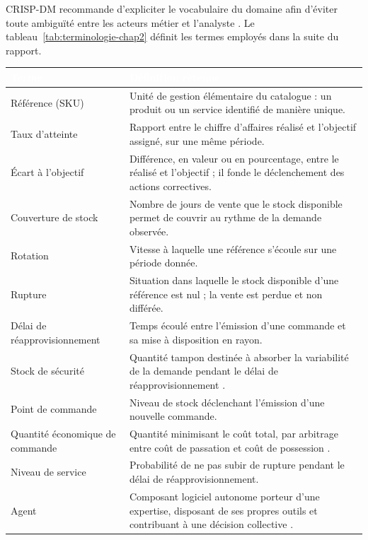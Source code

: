 CRISP-DM recommande d'expliciter le vocabulaire du domaine afin d'éviter toute ambiguïté entre les acteurs métier et l'analyste \cite{chapman2000crisp}. Le tableau~\ref{tab:terminologie-chap2} définit les termes employés dans la suite du rapport.

\begin{longtable}{|P{3.6cm}|P{10.6cm}|}
\hline
{}
\textcolor{white}{\textbf{Terme}} &
\textcolor{white}{\textbf{Définition retenue}} \\
\hline
\endhead
\hline
\endfoot
\hline
\endlastfoot
Référence (SKU) & Unité de gestion élémentaire du catalogue : un produit ou un service identifié de manière unique. \\
\hline
Taux d'atteinte & Rapport entre le chiffre d'affaires réalisé et l'objectif assigné, sur une même période. \\
\hline
Écart à l'objectif & Différence, en valeur ou en pourcentage, entre le réalisé et l'objectif ; il fonde le déclenchement des actions correctives. \\
\hline
Couverture de stock & Nombre de jours de vente que le stock disponible permet de couvrir au rythme de la demande observée. \\
\hline
Rotation & Vitesse à laquelle une référence s'écoule sur une période donnée. \\
\hline
Rupture & Situation dans laquelle le stock disponible d'une référence est nul ; la vente est perdue et non différée. \\
\hline
Délai de réapprovisionnement & Temps écoulé entre l'émission d'une commande et sa mise à disposition en rayon. \\
\hline
Stock de sécurité & Quantité tampon destinée à absorber la variabilité de la demande pendant le délai de réapprovisionnement \cite{axsater2015inventory}. \\
\hline
Point de commande & Niveau de stock déclenchant l'émission d'une nouvelle commande. \\
\hline
Quantité économique de commande & Quantité minimisant le coût total, par arbitrage entre coût de passation et coût de possession \cite{harris1913eoq}. \\
\hline
Niveau de service & Probabilité de ne pas subir de rupture pendant le délai de réapprovisionnement. \\
\hline
Agent & Composant logiciel autonome porteur d'une expertise, disposant de ses propres outils et contribuant à une décision collective \cite{wooldridge2009mas}. \\

\end{longtable}
